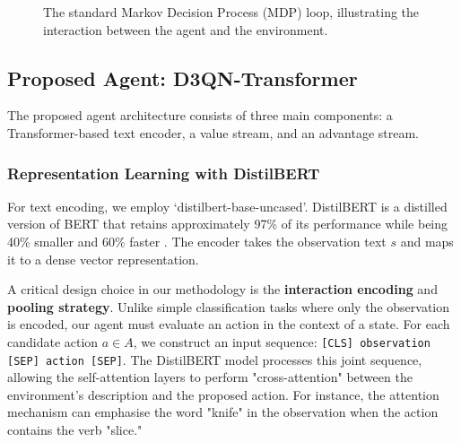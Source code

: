 \documentclass[11pt,a4paper]{article}
\begin{document}
\begin{figure}[H]
\centering
{}
\caption{The standard Markov Decision Process (MDP) loop, illustrating the interaction between the agent and the environment.}
\end{figure}


\subsection{Proposed Agent: D3QN-Transformer}
The proposed agent architecture consists of three main components: a Transformer-based text encoder, a value stream, and an advantage stream.

\subsubsection{Representation Learning with DistilBERT}
For text encoding, we employ `distilbert-base-uncased'. DistilBERT is a distilled version of BERT that retains approximately 97\% of its performance while being 40\% smaller and 60\% faster \citep{sanh2019distilbert}. The encoder takes the observation text $s$ and maps it to a dense vector representation.

A critical design choice in our methodology is the \textbf{interaction encoding} and \textbf{pooling strategy}. Unlike simple classification tasks where only the observation is encoded, our agent must evaluate an action in the context of a state. For each candidate action $a \in A$, we construct an input sequence: \texttt{[CLS] observation [SEP] action [SEP]}. The DistilBERT model processes this joint sequence, allowing the self-attention layers to perform "cross-attention" between the environment's description and the proposed action. For instance, the attention mechanism can emphasise the word "knife" in the observation when the action contains the verb "slice." 
\end{document}
